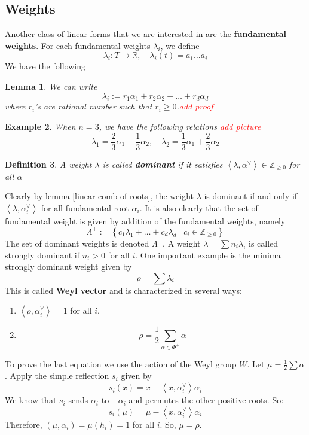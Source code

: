 \documentclass[12pt]{article} %
\newtheorem{definition}{Definition}[section]
\newtheorem{lemma}[definition]{Lemma}
\newtheorem{example}[definition]{Example}
\begin{document}
\subsection{Weights}
Another class of linear forms that we are interested in are the \textbf{fundamental weights}. For each fundamental
weights $\lambda_i$, we define
\[\lambda_i \colon T \to \mathbb{R}, \quad\lambda_i(t) = a_1\ldots a_i\]
We have the following
\begin{lemma}\label{linear-comb-of-weights}
    We can write
    \[\lambda_i := r_1\alpha_1 + r_2\alpha_2+\ldots + r_d\alpha_d\]
    where $r_i$'s are rational number such that $r_i \ge 0$.\textcolor{red}{add proof}
\end{lemma}
\begin{example}
    When $n=3$, we have the following relations \textcolor{red}{add picture}
    \[\lambda_1 = \dfrac{2}{3}\alpha_1+\dfrac{1}{3}\alpha_2, \quad \lambda_2 = \dfrac{1}{3}\alpha_1+\dfrac{2}{3}\alpha_2\]
\end{example}
\begin{definition}
    A weight $\lambda$ is called \textbf{dominant} if it satisfies $\left\langle \lambda,\alpha^{\vee} \right\rangle \in \mathbb{Z}_{\ge 0}$ for all $\alpha$
\end{definition}
Clearly by lemma \ref{linear-comb-of-roots}, the weight $\lambda$ is dominant if and only if $\left\langle\lambda,\alpha_i^\vee\right\rangle$ for all
fundamental root $\alpha_i$. It is also clearly that the set of fundamental weight is given by addition of the fundamental weights, namely
\[\Lambda^+ := \left\lbrace c_1\lambda_1+\ldots+c_d\lambda_d \mid c_i \in \mathbb{Z}_{\ge 0}\right\rbrace\]
The set of dominant weights is denoted $\Lambda^+$. A weight $\lambda = \sum n_i \lambda_i$ is called strongly dominant if $n_i > 0$ for all $i$. One important example is the minimal strongly dominant weight given by
\[
    \rho = \sum \lambda_i
\]
This is called \textbf{Weyl vector} and is characterized in several ways:

\begin{enumerate}
    \item $\left\langle\rho,\alpha_i^\vee\right\rangle = 1$ for all $i$.
    \item
          \[
              \rho = \frac{1}{2} \sum_{\alpha \in \Phi^+} \alpha
          \]
\end{enumerate}

To prove the last equation we use the action of the Weyl group $W$. Let $\mu = \frac{1}{2} \sum \alpha$. Apply the simple reflection $s_i$ given by
\[
    s_i(x) = x - \left\langle x, \alpha_i^\vee\right\rangle \alpha_i
\]
We know that $s_i$ sends $\alpha_i$ to $-\alpha_i$ and permutes the other positive roots. So:
\[
    s_i(\mu) = \mu -  \left\langle x, \alpha_i^\vee\right\rangle  \alpha_i
\]
Therefore, $(\mu, \alpha_i) = \mu(h_i) = 1$ for all $i$. So, $\mu = \rho$.
\end{document}
